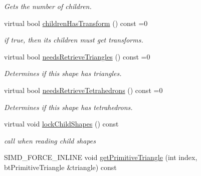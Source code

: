 \begin{Indent}{\bf }
\begin{CompactItemize}
\begin{CompactList}\small\item\em Gets the number of children. \item\end{CompactList}\item 
\hypertarget{classbt_g_impact_shape_interface_9ea24ba36990721e4f55851afc421e06}{
virtual bool \hyperlink{classbt_g_impact_shape_interface_9ea24ba36990721e4f55851afc421e06}{childrenHasTransform} () const =0}
\label{classbt_g_impact_shape_interface_9ea24ba36990721e4f55851afc421e06}

\begin{CompactList}\small\item\em if true, then its children must get transforms. \item\end{CompactList}\item 
\hypertarget{classbt_g_impact_shape_interface_62093ef330529ac27df9538313ece90a}{
virtual bool \hyperlink{classbt_g_impact_shape_interface_62093ef330529ac27df9538313ece90a}{needsRetrieveTriangles} () const =0}
\label{classbt_g_impact_shape_interface_62093ef330529ac27df9538313ece90a}

\begin{CompactList}\small\item\em Determines if this shape has triangles. \item\end{CompactList}\item 
\hypertarget{classbt_g_impact_shape_interface_d3f86cd0b7d0bbfd272fd6e815e17485}{
virtual bool \hyperlink{classbt_g_impact_shape_interface_d3f86cd0b7d0bbfd272fd6e815e17485}{needsRetrieveTetrahedrons} () const =0}
\label{classbt_g_impact_shape_interface_d3f86cd0b7d0bbfd272fd6e815e17485}

\begin{CompactList}\small\item\em Determines if this shape has tetrahedrons. \item\end{CompactList}\item 
\hypertarget{classbt_g_impact_shape_interface_e5de49e788c97a954ab9f2bde16adf60}{
virtual void \hyperlink{classbt_g_impact_shape_interface_e5de49e788c97a954ab9f2bde16adf60}{lockChildShapes} () const }
\label{classbt_g_impact_shape_interface_e5de49e788c97a954ab9f2bde16adf60}

\begin{CompactList}\small\item\em call when reading child shapes \item\end{CompactList}\item 
\hypertarget{classbt_g_impact_shape_interface_8b5c48d7831cebf1099b8c983cb3f149}{
SIMD\_\-FORCE\_\-INLINE void \hyperlink{classbt_g_impact_shape_interface_8b5c48d7831cebf1099b8c983cb3f149}{getPrimitiveTriangle} (int index, btPrimitiveTriangle \&triangle) const }
\label{classbt_g_impact_shape_interface_8b5c48d7831cebf1099b8c983cb3f149}


\end{CompactItemize}
\end{Indent}
